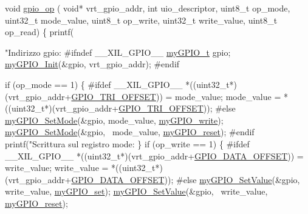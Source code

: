 \begin{DoxyCodeInclude}
{\textcolor{keywordtype}{void} \hyperlink{uio-int_8c_a78b676750c5d08c316cad35ec3963c53}{gpio\_op} (   \textcolor{keywordtype}{void}*       vrt\_gpio\_addr,
                \textcolor{keywordtype}{int}         uio\_descriptor,
                uint8\_t     op\_mode,
                uint32\_t    mode\_value,
                uint8\_t     op\_write,
                uint32\_t    write\_value,
                uint8\_t     op\_read)
\{
    printf(\textcolor{stringliteral}{"Indirizzo gpio: %
\textcolor{preprocessor}{#ifndef \_\_XIL\_GPIO\_\_}
    \hyperlink{structmy_g_p_i_o__t}{myGPIO\_t} gpio;
    \hyperlink{group__bare-metal_ga588201358d1633c53535b288c9198531}{myGPIO\_Init}(&gpio, vrt\_gpio\_addr);
\textcolor{preprocessor}{#endif}

    \textcolor{keywordflow}{if} (op\_mode == 1) \{
\textcolor{preprocessor}{#ifdef \_\_XIL\_GPIO\_\_}
        *((uint32\_t*)(vrt\_gpio\_addr+\hyperlink{xil__gpio_8h_a6e2a77c24e8a4e2b3800085ac10a8cf6}{GPIO\_TRI\_OFFSET})) = mode\_value;
        mode\_value = *((uint32\_t*)(vrt\_gpio\_addr+\hyperlink{xil__gpio_8h_a6e2a77c24e8a4e2b3800085ac10a8cf6}{GPIO\_TRI\_OFFSET}));
\textcolor{preprocessor}{#else}
        \hyperlink{group__bare-metal_ga43e82eb0febd452635a438fbd9cb853b}{myGPIO\_SetMode}(&gpio, mode\_value, \hyperlink{group__bare-metal_gga76b849f0e0c05e7f9161bdb33396f2b1a2d66976280eb7595a42c631683bdfad6}{myGPIO\_write});
        \hyperlink{group__bare-metal_ga43e82eb0febd452635a438fbd9cb853b}{myGPIO\_SetMode}(&gpio, ~mode\_value, \hyperlink{group__bare-metal_ggaf634fe4a0e1eab8da5000b72d6ad362ba98cde80dbda025bd1ae7231c76b55674}{myGPIO\_reset});
\textcolor{preprocessor}{#endif}
        printf(\textcolor{stringliteral}{"Scrittura sul registro mode: %
    \}
    \textcolor{keywordflow}{if} (op\_write == 1) \{
\textcolor{preprocessor}{#ifdef \_\_XIL\_GPIO\_\_}
        *((uint32\_t*)(vrt\_gpio\_addr+\hyperlink{xil__gpio_8h_a78907649b00f7076af686bcac4cd1b8c}{GPIO\_DATA\_OFFSET})) = write\_value;
        write\_value = *((uint32\_t*)(vrt\_gpio\_addr+\hyperlink{xil__gpio_8h_a78907649b00f7076af686bcac4cd1b8c}{GPIO\_DATA\_OFFSET}));
\textcolor{preprocessor}{#else}
        \hyperlink{group__bare-metal_ga9d9ce9d2db7d77a588da4a3749f2f24d}{myGPIO\_SetValue}(&gpio, write\_value, \hyperlink{group__bare-metal_ggaf634fe4a0e1eab8da5000b72d6ad362ba10d296f3711d01189cc6c2d87f7c9149}{myGPIO\_set});
        \hyperlink{group__bare-metal_ga9d9ce9d2db7d77a588da4a3749f2f24d}{myGPIO\_SetValue}(&gpio, ~write\_value, \hyperlink{group__bare-metal_ggaf634fe4a0e1eab8da5000b72d6ad362ba98cde80dbda025bd1ae7231c76b55674}{myGPIO\_reset});
}}}
\end{DoxyCodeInclude}
